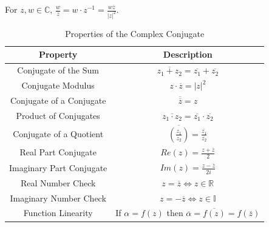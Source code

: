 \begin{definition}
    [Division]
    For $z, w \in \mathbb{C}$, $\frac{w}{z} = w \cdot z^{-1} = \frac{w\overline{z}}{|z|^2}$.
\end{definition}
\begin{table}[htbp]
    \centering
    \caption{Properties of the Complex Conjugate}
    \begin{tabular}{|c|c|}
        \hline
        \textbf{Property}        & \textbf{Description}                                                              \\
        \hline
        Conjugate of the Sum     & $\overline{z_1 + z_2} = \overline{z_1} + \overline{z_2}$                          \\
        \hline
        Conjugate Modulus        & $ z \cdot \overline{z}= |z|^2$                                                    \\
        \hline
        Conjugate of a Conjugate & $\overline{\overline{z}} = z$                                                     \\
        \hline
        Product of Conjugates    & $\overline{z_1 \cdot z_2} = \overline{z_1} \cdot \overline{z_2}$                  \\
        \hline
        Conjugate of a Quotient  & $\overline{\left(\frac{z_1}{z_2}\right)} = \frac{\overline{z_1}}{\overline{z_2}}$ \\
        \hline
        Real Part Conjugate      & $Re(z) = \frac{z + \overline{z}}{2}$                                              \\
        \hline
        Imaginary Part Conjugate & $Im(z) = \frac{z - \overline{z}}{2i}$                                             \\
        \hline
        Real Number Check        & $z = \overline{z} \iff z \in \mathbb{R}$                                          \\
        \hline
        Imaginary Number Check   & $z = -\overline{z} \iff z \in \mathbb{I}$                                         \\
        \hline
        Function Linearity       & If $\alpha = f(z)$ then $\overline{\alpha} = \overline{f(z)} = f(\overline{z})$   \\
        \hline
    \end{tabular}
\end{table}


